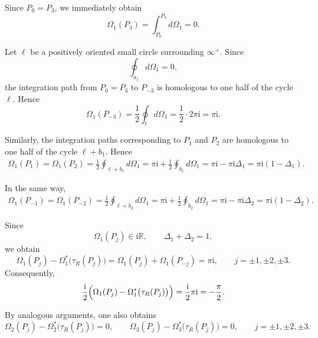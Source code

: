 \documentclass{amsart}
\numberwithin{equation}{hw}
\begin{document}
Since \(P_0=P_3\), we immediately obtain
\begin{equation}
\Omega_1(P_3)
=
\int_{P_0}^{P_3} d\Omega_1
=
0.
\label{eq:Omega1-P3}
\end{equation}

Let \(\ell\) be a positively oriented small circle surrounding \(\infty^+\). Since
\[
\oint_{a_j} d\Omega_1=0,
\]
the integration path from \(P_0=P_3\) to \(P_{-3}\) is homologous to one half of the cycle \(\ell\). Hence
\begin{equation}
\Omega_1(P_{-3})
=
\frac{1}{2}\oint_{\ell} d\Omega_1
=
\frac{1}{2}\cdot 2\pi\mathrm{i}
=
\pi\mathrm{i}.
\label{eq:Omega1-Pminus3}
\end{equation}

Similarly, the integration paths corresponding to \(P_1\) and \(P_2\) are homologous to one half of the cycle \(\ell+b_1\). Hence
\begin{align}
\Omega_1(P_1)
=
\Omega_1(P_2)
=
\frac{1}{2}
\oint_{\ell+b_1} d\Omega_1
=
\pi\mathrm{i}
+
\frac{1}{2}\oint_{b_1} d\Omega_1
=
\pi\mathrm{i}
-
\pi\mathrm{i}\Delta_1
=
\pi\mathrm{i}(1-\Delta_1).
\label{eq:Omega1-P1}
\end{align}

In the same way,
\begin{align}
\Omega_1(P_{-1})
=
\Omega_1(P_{-2})
=
\frac{1}{2}
\oint_{\ell+b_2} d\Omega_1
=
\pi\mathrm{i}
+
\frac{1}{2}\oint_{b_2} d\Omega_1
=
\pi\mathrm{i}
-
\pi\mathrm{i}\Delta_2
=
\pi\mathrm{i}(1-\Delta_2).
\label{eq:Omega1-Pminus1}
\end{align}

Since
\[
\Omega_1(P_j)\in\mathrm{i}\mathbb{R},
\qquad
\Delta_1+\Delta_2=1,
\]
we obtain
\begin{equation}
\Omega_1(P_j)
-
\Omega_1^*\bigl(\tau_R(P_j)\bigr)
=
\Omega_1(P_j)
+
\Omega_1(P_{-j})
=
\pi\mathrm{i},
\qquad
j=\pm1,\pm2,\pm3.
\label{eq:Omega1-reality}
\end{equation}
Consequently,
\begin{equation}
\frac{\mathrm{i}}{2}
\Bigl(
\Omega_1(P_j)
-
\Omega_1^*\bigl(\tau_R(P_j)\bigr)
\Bigr)
=
\frac{\mathrm{i}}{2}\pi\mathrm{i}
=
-
\frac{\pi}{2}.
\label{eq:Omega1-phase}
\end{equation}

By analogous arguments, one also obtains
\begin{equation}
\Omega_2(P_j)
-
\Omega_2^*\bigl(\tau_R(P_j)\bigr)
=
0,
\qquad
\Omega_3(P_j)
-
\Omega_3^*\bigl(\tau_R(P_j)\bigr)
=
0,
\qquad
j=\pm1,\pm2,\pm3.
\label{eq:Omega23-reality}
\end{equation}
\end{document}
